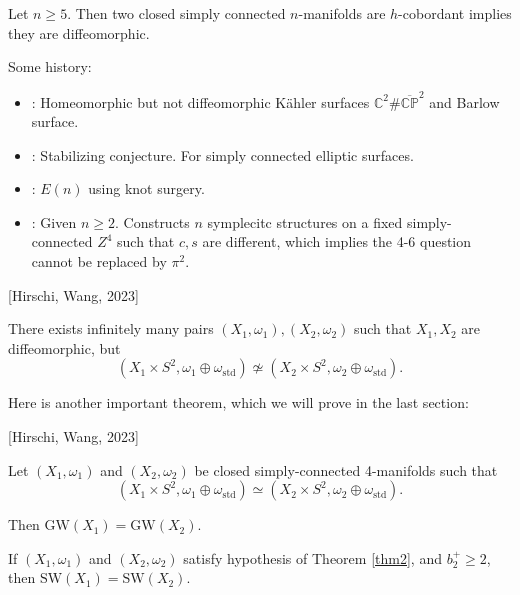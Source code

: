 \begin{theorem}
[Smale, 1962]

Let $n\ge 5$. Then two closed simply connected $n$-manifolds are $h$-cobordant implies they are diffeomorphic.

\end{theorem}

Some history:
\begin{itemize}
\item \text{[Ruan, 1994]}: Homeomorphic but not diffeomorphic Kähler surfaces $\mathbb{C}^2 \# \overline{\mathbb{CP}}^2$ and Barlow surface.
\item {}: Stabilizing conjecture. For simply connected elliptic surfaces.
\item {}: $E(n)$ using knot surgery.
\item \text{[Smith, 2000]}: Given $n\ge 2$. Constructs $n$ symplecitc structures on a fixed simply-connected $Z^4$ such that $c,s$ are different, which implies the 4-6 question cannot be replaced by $\pi^2$.
\end{itemize}

\begin{theorem}
\label{thm1}
[Hirschi, Wang, 2023]

There exists infinitely many pairs $(X_1, \omega_1), (X_2, \omega_2)$ such that $X_1, X_2$ are diffeomorphic, but
\[
(X_1 \times S^2, \omega_1 \oplus \omega_{\text{std}}) \not\simeq (X_2 \times S^2, \omega_2 \oplus \omega_{\text{std}}).
\]

\end{theorem}

Here is another important theorem, which we will prove in the last section:

\begin{theorem}
\label{thm2}
[Hirschi, Wang, 2023]

Let $(X_1, \omega_1)$ and $(X_2, \omega_2)$ be closed simply-connected 4-manifolds such that
\[
(X_1 \times S^2, \omega_1 \oplus \omega_{\text{std}}) \simeq (X_2 \times S^2, \omega_2 \oplus \omega_{\text{std}}).
\]

Then $\text{GW}(X_1)=\text{GW}(X_2)$.

\end{theorem}

\begin{corollary}

If $(X_1, \omega_1)$ and $(X_2, \omega_2)$ satisfy hypothesis of Theorem \ref{thm2}, and $b_2^+ \ge 2$, then $\text{SW}(X_1)=\text{SW}(X_2)$.

\end{corollary}

